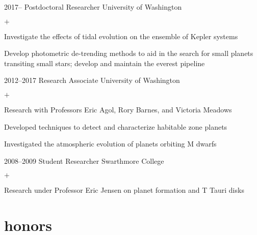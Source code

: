 \documentclass[]{luger-cv} %
\begin{document}
\begin{entrylist}


\entry
{2017--}
{Postdoctoral Researcher}
{University of Washington}
{%
\vspace{-1em}
\begin{list}{$+$}{\cvlist}
\item Investigate the effects of tidal evolution on the ensemble of Kepler systems
\item Develop photometric de-trending methods to aid in the search for small
      planets transiting small stars; develop and maintain the everest pipeline
\end{list}
}


\entry
{2012--2017}
{Research Associate}
{University of Washington}
{%
\vspace{-1em}
\begin{list}{$+$}{\cvlist}
\item Research with Professors Eric Agol, Rory Barnes, and Victoria Meadows
\item Developed techniques to detect and characterize habitable
zone planets
\item Investigated the atmospheric evolution of planets orbiting M dwarfs
\end{list}
}


\entry
{2008--2009}
{Student Researcher}
{Swarthmore College}
{%
\vspace{-1em}
\begin{list}{$+$}{\cvlist}
\item Research under Professor Eric Jensen on planet formation and T Tauri disks
\end{list}
}


\end{entrylist}


\section{honors}
\end{document}
